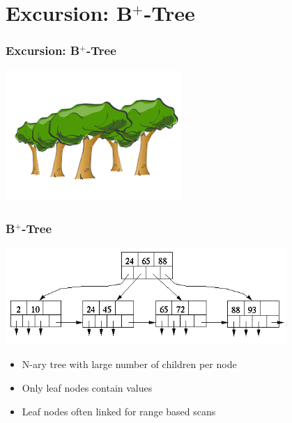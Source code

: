 \documentclass{beamer}
\begin{document}
\section{Excursion: B$^{+}$-Tree} 
\begin{frame}
\frametitle{Excursion: B$^{+}$-Tree}
\begin{center}
	\includegraphics[width=0.5\textwidth]{img/forest.png}
\end{center}
\end{frame}
\begin{frame}
\frametitle{B$^{+}$-Tree}
	\begin{center}
		\includegraphics[width=0.8\textwidth]{img/b_tree.png}
	\end{center}
	\begin{itemize}
		\item N-ary tree with large number of children per node
		\item Only leaf nodes contain values
		\item Leaf nodes often linked for range based scans
	\end{itemize}
\end{frame}
\end{document}

